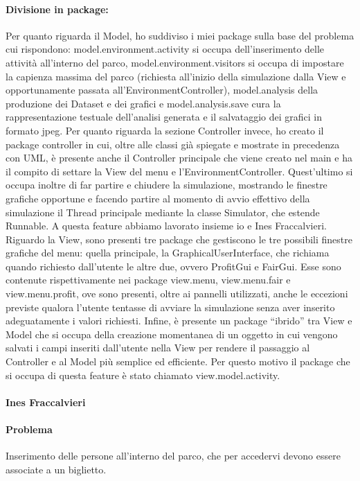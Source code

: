 \documentclass[a4paper,12pt]{report}
\begin{document}
\paragraph{Divisione in package:}
Per quanto riguarda il Model, ho suddiviso i miei package sulla base del problema cui rispondono: model.environment.activity si occupa dell’inserimento delle attività all’interno del parco, model.environment.visitors si occupa di impostare la capienza massima del parco (richiesta all’inizio della simulazione dalla View e opportunamente passata all’EnvironmentController), model.analysis della produzione dei Dataset e dei grafici e model.analysis.save cura la rappresentazione testuale dell’analisi generata e il salvataggio dei grafici in formato jpeg.
Per quanto riguarda la sezione Controller invece, ho creato il package controller in cui, oltre alle classi già spiegate e mostrate in precedenza con UML, è presente anche il Controller principale che viene creato nel main e ha il compito di settare la View del menu e l’EnvironmentController. Quest’ultimo si occupa inoltre di far partire e chiudere la simulazione, mostrando le finestre grafiche opportune e facendo partire al momento di avvio effettivo della simulazione il Thread principale mediante la classe Simulator, che estende Runnable. A questa feature abbiamo lavorato insieme io e Ines Fraccalvieri.
Riguardo la View, sono presenti tre package che gestiscono le tre possibili finestre grafiche del menu: quella principale, la GraphicalUserInterface, che richiama quando richiesto dall’utente le altre due, ovvero ProfitGui e FairGui. Esse sono contenute rispettivamente nei package view.menu, view.menu.fair e view.menu.profit, ove sono presenti, oltre ai pannelli utilizzati, anche le eccezioni previste qualora l’utente tentasse di avviare la simulazione senza aver inserito adeguatamente i valori richiesti. 
Infine, è presente un package “ibrido” tra View e Model che si occupa della creazione momentanea di un oggetto in cui vengono salvati i campi inseriti dall’utente nella View per rendere il passaggio al Controller e al Model più semplice ed efficiente. Per questo motivo il package che si occupa di questa feature è stato chiamato view.model.activity.

\onecolumn
\paragraph{Ines Fraccalvieri}

\paragraph{Problema} Inserimento delle persone all'interno del parco, che per accedervi devono essere associate a un biglietto.
\end{document}
